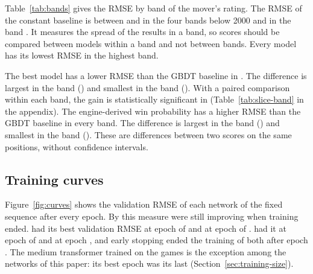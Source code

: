 \documentclass[11pt]{article}
\begin{document}
Table~\ref{tab:bands} gives the RMSE by band of the mover's rating. The RMSE
of the constant baseline is between  and  in
the four bands below 2000 and  in the band .
It measures the spread of the results in a band, so scores should be compared
between models within a band and not between bands. Every model has its
lowest RMSE in the highest band.

\begin{table}[htbp]\centering\small
{}
\caption{Test RMSE by band of the mover's rating. The spread of the results
differs between bands, so values are comparable within a column and not
between columns.}
\label{tab:bands}
\end{table}

The best model has a lower RMSE than the GBDT baseline in
. The difference is largest in the band
 () and smallest in the band
 ().\iflook{} With a
paired comparison within each band, the gain is statistically significant in
 (Table~\ref{tab:slice-band} in the appendix). The
engine-derived win probability has a higher RMSE than the GBDT baseline in
every band. The difference is largest in the band
() and smallest in the band
(). These are differences between two
scores on the same positions, without confidence intervals.\fi

\subsection{Training curves}

Figure~\ref{fig:curves} shows the validation RMSE of each network of the
fixed sequence after every epoch. By this measure
 were still improving when training ended.
 had its best validation RMSE at epoch
 of  and
 at epoch  of
.  had it at epoch
 of 
and  at epoch
, and early stopping ended the
training of both after epoch .
\ifmore
The medium transformer trained on  the
games is the exception among the networks of this paper: its best epoch was
its last (Section~\ref{sec:training-size}).
\fi
\end{document}

